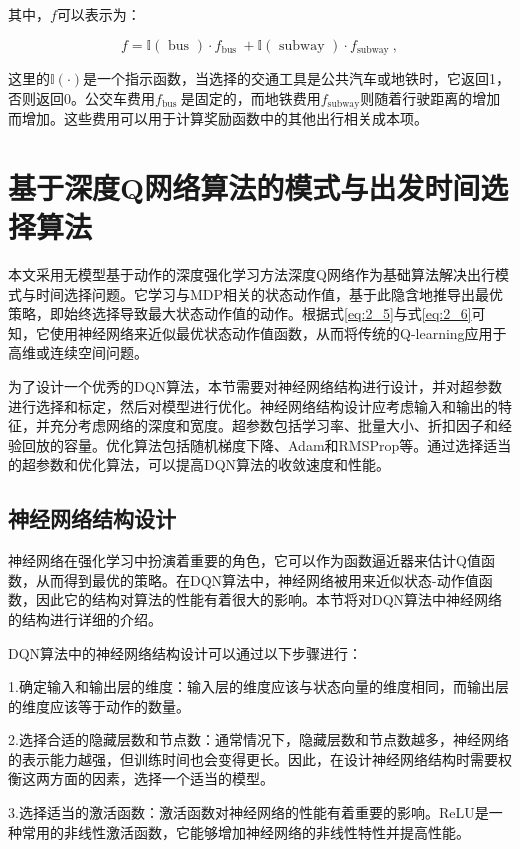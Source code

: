 其中，$f$可以表示为：

\begin{equation}
f=\mathbb{I}(\text { bus }) \cdot f_{\text {bus }}+\mathbb{I}(\text { subway }) \cdot f_{\text {subway }},
\end{equation}

这里的$\mathbb{I}(\cdot)$是一个指示函数，当选择的交通工具是公共汽车或地铁时，它返回1，否则返回0。公交车费用$f_{\text {bus }}$是固定的，而地铁费用$f_{\text {subway} }$则随着行驶距离的增加而增加。这些费用可以用于计算奖励函数中的其他出行相关成本项。

\section{基于深度Q网络算法的模式与出发时间选择算法}

本文采用无模型基于动作的深度强化学习方法深度Q网络作为基础算法解决出行模式与时间选择问题。它学习与MDP相关的状态动作值，基于此隐含地推导出最优策略，即始终选择导致最大状态动作值的动作。根据式\ref{eq:2_5}与式\ref{eq:2_6}可知，它使用神经网络来近似最优状态动作值函数，从而将传统的Q-learning应用于高维或连续空间问题。

为了设计一个优秀的DQN算法，本节需要对神经网络结构进行设计，并对超参数进行选择和标定，然后对模型进行优化。神经网络结构设计应考虑输入和输出的特征，并充分考虑网络的深度和宽度。超参数包括学习率、批量大小、折扣因子和经验回放的容量。优化算法包括随机梯度下降、Adam和RMSProp等。通过选择适当的超参数和优化算法，可以提高DQN算法的收敛速度和性能。

\subsection{神经网络结构设计}


神经网络在强化学习中扮演着重要的角色，它可以作为函数逼近器来估计Q值函数，从而得到最优的策略。在DQN算法中，神经网络被用来近似状态-动作值函数，因此它的结构对算法的性能有着很大的影响。本节将对DQN算法中神经网络的结构进行详细的介绍。

DQN算法中的神经网络结构设计可以通过以下步骤进行：

1.确定输入和输出层的维度：输入层的维度应该与状态向量的维度相同，而输出层的维度应该等于动作的数量。

2.选择合适的隐藏层数和节点数：通常情况下，隐藏层数和节点数越多，神经网络的表示能力越强，但训练时间也会变得更长。因此，在设计神经网络结构时需要权衡这两方面的因素，选择一个适当的模型。

3.选择适当的激活函数：激活函数对神经网络的性能有着重要的影响。ReLU是一种常用的非线性激活函数，它能够增加神经网络的非线性特性并提高性能。

